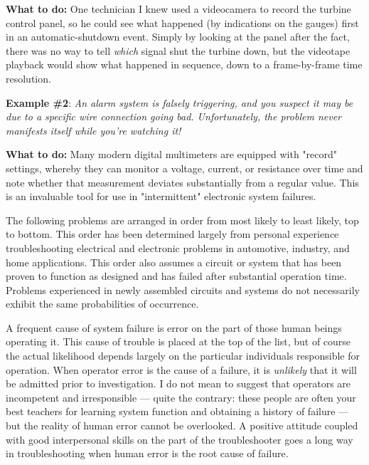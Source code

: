 {\bf What to do:} One technician I knew used a videocamera to record the
turbine control panel, so he could see what happened (by indications on
the gauges) first in an automatic-shutdown event. Simply by looking at
the panel after the fact, there was no way to tell {\em which} signal
shut the turbine down, but the videotape playback would show what
happened in sequence, down to a frame-by-frame time resolution.

{\bf Example \#2}: {\em An alarm system is falsely triggering, and you
suspect it may be due to a specific wire connection going bad.
Unfortunately, the problem never manifests itself while you're watching
it!}

{\bf What to do:} Many modern digital multimeters are equipped with
"record" settings, whereby they can monitor a voltage, current, or
resistance over time and note whether that measurement deviates
substantially from a regular value. This is an invaluable tool for use
in "intermittent" electronic system failures.

\stopsubsection

\stopsection

\startsection[title={Likely Failures in Proven
Systems},reference={sec:xtocid157909713}]

The following problems are arranged in order from most likely to least
likely, top to bottom. This order has been determined largely from
personal experience troubleshooting electrical and electronic problems
in automotive, industry, and home applications. This order also assumes
a circuit or system that has been proven to function as designed and has
failed after substantial operation time. Problems experienced in newly
assembled circuits and systems do not necessarily exhibit the same
probabilities of occurrence.

\startsubsection[title={Operator Error},reference={sec:xtocid157909714}]

A frequent cause of system failure is error on the part of those human
beings operating it. This cause of trouble is placed at the top of the
list, but of course the actual likelihood depends largely on the
particular individuals responsible for operation. When operator error is
the cause of a failure, it is {\em unlikely} that it will be admitted
prior to investigation. I do not mean to suggest that operators are
incompetent and irresponsible --- quite the contrary: these people are
often your best teachers for learning system function and obtaining a
history of failure --- but the reality of human error cannot be
overlooked. A positive attitude coupled with good interpersonal skills
on the part of the troubleshooter goes a long way in troubleshooting
when human error is the root cause of failure.

